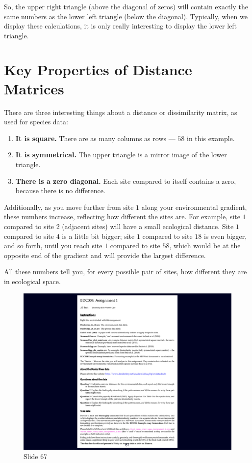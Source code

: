 \documentclass[
  11pt,
]{book}
\providecommand{\tightlist}{%
  \setlength{\itemsep}{0pt}\setlength{\parskip}{0pt}}
\begin{document}
So, the upper right triangle (above the diagonal of zeros) will contain
exactly the same numbers as the lower left triangle (below the
diagonal). Typically, when we display these calculations, it is only
really interesting to display the lower left triangle.

\section{Key Properties of Distance
Matrices}\label{key-properties-of-distance-matrices}

There are three interesting things about a distance or dissimilarity
matrix, as used for species data:

\begin{enumerate}
\def\labelenumi{\arabic{enumi}.}
\tightlist
\item
  \textbf{It is square.} There are as many columns as rows --- \(58\) in
  this example.
\item
  \textbf{It is symmetrical.} The upper triangle is a mirror image of
  the lower triangle.
\item
  \textbf{There is a zero diagonal.} Each site compared to itself
  contains a zero, because there is no difference.
\end{enumerate}

Additionally, as you move further from site \(1\) along your
environmental gradient, these numbers increase, reflecting how different
the sites are. For example, site \(1\) compared to site \(2\) (adjacent
sites) will have a small ecological distance. Site \(1\) compared to
site \(4\) is a little bit bigger; site \(1\) compared to site \(18\) is
even bigger, and so forth, until you reach site \(1\) compared to site
\(58\), which would be at the opposite end of the gradient and will
provide the largest difference.

All these numbers tell you, for every possible pair of sites, how
different they are in ecological space.

\begin{figure}[ht]
\centering
\includegraphics[width=0.8\linewidth]{../images/BDC334/BDC334-067.jpeg}
\caption*{Slide 67}
\end{figure}
\end{document}
